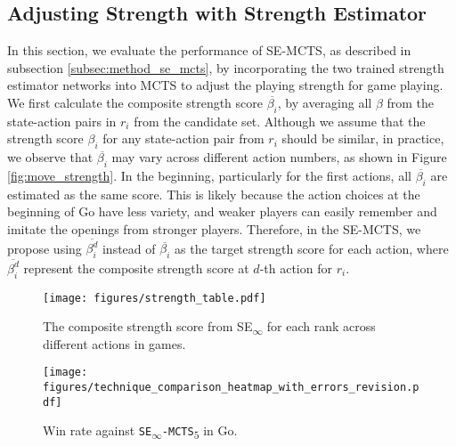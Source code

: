 \subsection{Adjusting Strength with Strength Estimator}
\label{subsec:exp_se_mcts}
In this section, we evaluate the performance of SE-MCTS, as described in subsection \ref{subsec:method_se_mcts}, by incorporating the two trained strength estimator networks into MCTS to adjust the playing strength for game playing.
We first calculate the composite strength score $\overline{\beta_i}$, by averaging all $\beta$ from the state-action pairs in $r_i$ from the candidate set.
Although we assume that the strength score $\beta_i$ for any state-action pair from $r_i$ should be similar, in practice, we observe that $\overline{\beta_i}$ may vary across different action numbers, as shown in Figure \ref{fig:move_strength}.
In the beginning, particularly for the first actions, all $\overline{\beta_i}$ are estimated as the same score.
This is likely because the action choices at the beginning of Go have less variety, and weaker players can easily remember and imitate the openings from stronger players.
Therefore, in the SE-MCTS, we propose using $\overline{\beta_i^d}$ instead of $\overline{\beta_i}$ as the target strength score for each action, where $\overline{\beta_i^d}$ represent the composite strength score at $d$-th action for $r_i$.





\begin{figure}[ht]
\centering
\begin{minipage}{0.55\textwidth}
    \texttt{[image: figures/strength\_table.pdf]}
    \caption{The composite strength score from SE\textsubscript{$\infty$} for each rank across different actions in games.}
    \label{fig:move_strength}
\end{minipage}
\hspace{1em}
\begin{minipage}{0.33\textwidth}
    \texttt{[image: figures/technique\_comparison\_heatmap\_with\_errors\_revision.pdf]}
    \caption{Win rate against \texttt{SE\textsubscript{$\infty$}-MCTS\textsubscript{$5$}} in Go.}
    \label{fig:win_heatmap}
\end{minipage}
\end{figure}

